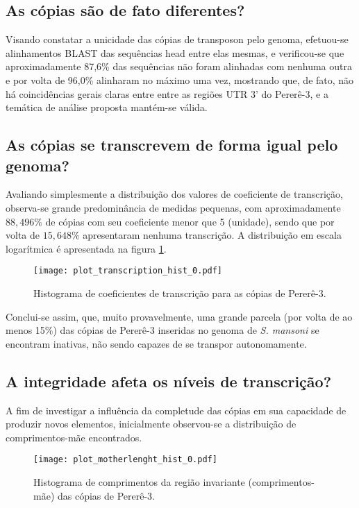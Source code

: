 \documentclass[12pt]{article}
\begin{document}
\begin{multicols}{2}
\subsection{As cópias são de fato diferentes?}
Visando constatar a unicidade das cópias de transposon pelo genoma, efetuou-se alinhamentos BLAST das sequências head entre elas mesmas, e verificou-se que aproximadamente 87,6\% das sequências não foram alinhadas com nenhuma outra e por volta de 96,0\% alinharam no máximo uma vez, mostrando que, de fato, não há coincidências gerais claras entre entre as regiões UTR 3' do Pererê-3, e a temática de análise proposta mantém-se válida.

\subsection{As cópias se transcrevem de forma igual pelo genoma?}
	Avaliando simplesmente a distribuição dos valores de coeficiente de transcrição, observa-se grande predominância de medidas pequenas, com aproximadamente \(88,496\)\% de cópias com seu coeficiente menor que 5 (unidade), sendo que por volta de \(15,648\)\% apresentaram nenhuma transcrição. A distribuição em escala logarítmica é apresentada na figura \ref{histtranscription}.

\begin{figure}[H]
	\label{histtranscription}
	\centering
	\texttt{[image: plot\_transcription\_hist\_0.pdf]}
	\caption{Histograma de coeficientes de transcrição para as cópias de Pererê-3.}
\end{figure}

	Conclui-se assim, que, muito provavelmente, uma grande parcela (por volta de ao menos 15\%) das cópias de Pererê-3 inseridas no genoma de \textit{S. mansoni} se encontram inativas, não sendo capazes de se transpor autonomamente.

\subsection{A integridade afeta os níveis de transcrição?}

A fim de investigar a influência da completude das cópias em sua capacidade de produzir novos elementos, inicialmente observou-se a distribuição de comprimentos-mãe encontrados.\\

\begin{figure}[H]
  \label{mlhist}
  \centering
  \texttt{[image: plot\_motherlenght\_hist\_0.pdf]}
	\caption{Histograma de comprimentos da região invariante (comprimentos-mãe) das cópias de Pererê-3.}
\end{figure}


\end{multicols}
\end{document}
